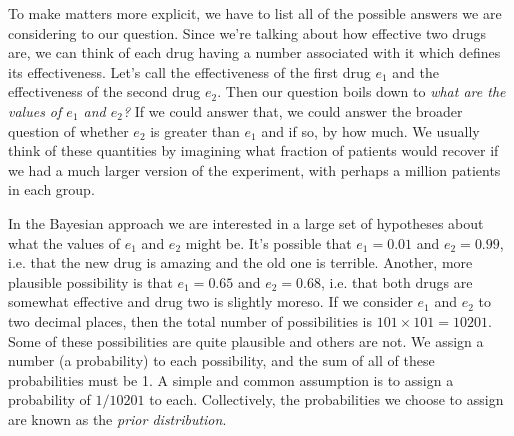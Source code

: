 \documentclass[a4paper, 12pt]{article}
\begin{document}
To make matters more explicit, we have to list all of the possible answers
we are considering to our question. Since we're talking about how effective
two drugs are, we can think of each drug having a number associated with it
which defines its effectiveness. Let's call the effectiveness of the first drug
$e_1$ and the effectiveness of the second drug $e_2$. Then our question boils
down to {\em what are the values of $e_1$ and $e_2$?} If we could answer that,
we could answer the broader question of whether $e_2$ is greater than $e_1$ and
if so, by how much. We usually think of these quantities by imagining what
fraction of patients would recover if we had a much larger version of the
experiment, with perhaps a million patients in each group.

In the Bayesian approach we are interested in a large set of hypotheses about
what the values of $e_1$ and $e_2$ might be. It's possible that $e_1=0.01$ and
$e_2 = 0.99$, i.e. that the new drug is amazing and the old one is terrible.
Another, more plausible possibility is that $e_1 = 0.65$ and $e_2=0.68$, i.e.
that both drugs are somewhat effective and drug two is slightly moreso. If we
consider $e_1$ and $e_2$ to two decimal places, then the total number of
possibilities is $101 \times 101 = 10201$. Some of these possibilities are
quite plausible and others are not. We assign a number (a probability) to each
possibility, and the sum of all of these probabilities must be 1. A simple and
common assumption is to assign a probability of $1/10201$ to each. Collectively,
the probabilities we choose to assign are known as the {\em prior distribution}.










\end{document}
